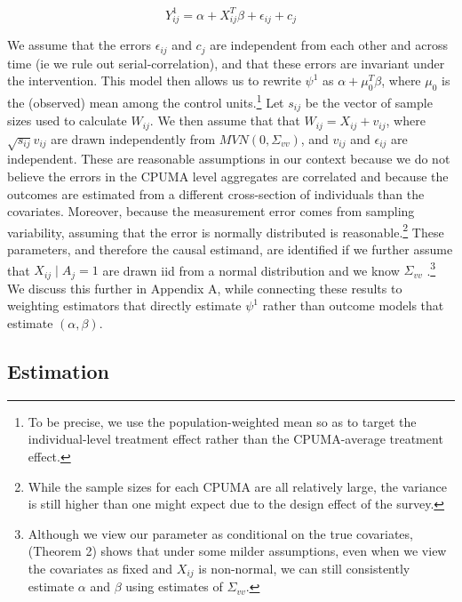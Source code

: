 \documentclass[12pt]{article}
\begin{document}
$$
Y_{ij}^1 = \alpha + X_{ij}^T\beta + \epsilon_{ij} + c_{j}
$$

We assume that the errors $\epsilon_{ij}$ and $c_j$ are independent from each other and across time (ie we rule out serial-correlation), and that these errors are invariant under the intervention. This model then allows us to rewrite $\psi^1$ as $\alpha + \mu_0^T\beta$, where $\mu_0$ is the (observed) mean among the control units.\footnote{To be precise, we use the population-weighted mean so as to target the individual-level treatment effect rather than the CPUMA-average treatment effect.} Let $s_{ij}$ be the vector of sample sizes used to calculate $W_{ij}$. We then assume that that $W_{ij} = X_{ij} + v_{ij}$, where $\sqrt{s_{ij}}v_{ij}$ are drawn independently from $MVN(0, \Sigma_{vv})$, and $v_{ij}$ and $\epsilon_{ij}$ are independent.  These are reasonable assumptions in our context because we do not believe the errors in the CPUMA level aggregates are correlated and because the outcomes are estimated from a different cross-section of individuals than the covariates. Moreover, because the measurement error comes from sampling variability, assuming that the error is normally distributed is reasonable.\footnote{While the sample sizes for each CPUMA are all relatively large, the variance is still higher than one might expect due to the design effect of the survey.} These parameters, and therefore the causal estimand, are identified if we further assume that $X_{ij} \mid A_j = 1$ are drawn iid from a normal distribution and we know $\Sigma_{vv}$ \cite{gleser1992importance}.\footnote{Although we view our parameter as conditional on the true covariates, \cite{gleser1992importance} (Theorem 2) shows that under some milder assumptions, even when we view the covariates as fixed and $X_{ij}$ is non-normal, we can still consistently estimate $\alpha$ and $\beta$ using estimates of $\Sigma_{vv}$.} We discuss this further in Appendix A, while connecting these results to weighting estimators that directly estimate $\psi^1$ rather than outcome models that estimate $(\alpha, \beta)$. 

\subsection{Estimation}
\end{document}
